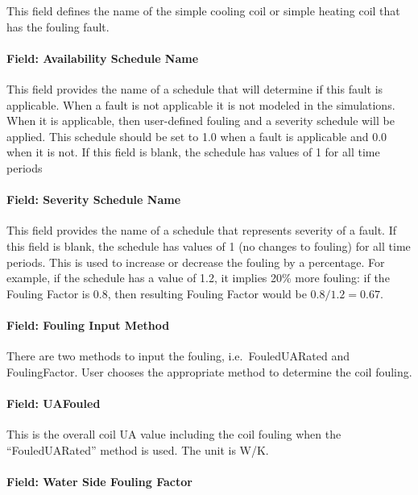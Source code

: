 This field defines the name of the simple cooling coil or simple heating coil that has the fouling fault.

\paragraph{Field: Availability Schedule Name}\label{field-availability-schedule-name-5-002}

This field provides the name of a schedule that will determine if this fault is applicable. When a fault is not applicable it is not modeled in the simulations. When it is applicable, then user-defined fouling and a severity schedule will be applied. This schedule should be set to 1.0 when a fault is applicable and 0.0 when it is not. If this field is blank, the schedule has values of 1 for all time periods

\paragraph{Field: Severity Schedule Name}\label{field-severity-schedule-name-5}

This field provides the name of a schedule that represents severity of a fault. If this field is blank, the schedule has values of 1 (no changes to fouling) for all time periods.
This is used to increase or decrease the fouling by a percentage. For example, if the schedule has a value of 1.2, it implies 20\% more fouling: if the Fouling Factor is 0.8, then resulting Fouling Factor would be $0.8 / 1.2 = 0.67$.

\paragraph{Field: Fouling Input Method}\label{field-fouling-input-method}

There are two methods to input the fouling, i.e.~FouledUARated and FoulingFactor. User chooses the appropriate method to determine the coil fouling.

\paragraph{Field: UAFouled}\label{field-uafouled}

This is the overall coil UA value including the coil fouling when the ``FouledUARated'' method is used. The unit is W/K.

\paragraph{Field: Water Side Fouling Factor}\label{field-water-side-fouling-factor}

